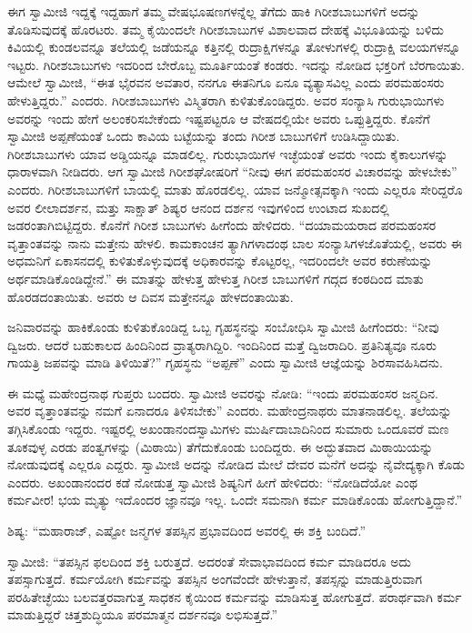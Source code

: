  ಈಗ ಸ್ವಾಮೀಜಿ ಇದ್ದಕ್ಕೆ ಇದ್ದಹಾಗೆ ತಮ್ಮ ವೇಷಭೂಷಣಗಳನ್ನೆಲ್ಲ ತೆಗೆದು ಹಾಕಿ ಗಿರೀಶಬಾಬುಗಳಿಗೆ ಅದನ್ನು ತೊಡಿಸುವುದಕ್ಕೆ ಹೊರಟರು. ತಮ್ಮ ಕೈಯಿಂದಲೇ ಗಿರೀಶಬಾಬುಗಳ ವಿಶಾಲವಾದ ದೇಹಕ್ಕೆ ವಿಭೂತಿಯನ್ನು ಬಳಿದು ಕಿವಿಯಲ್ಲಿ ಕುಂಡಲವನ್ನೂ ತಲೆಯಲ್ಲಿ ಜಡೆಯನ್ನೂ ಕತ್ತಿನಲ್ಲಿ ರುದ್ರಾಕ್ಷಿಗಳನ್ನೂ ತೋಳುಗಳಲ್ಲಿ ರುದ್ರಾಕ್ಷಿ ವಲಯಗಳನ್ನೂ ಇಟ್ಟರು. ಗಿರೀಶಬಾಬುಗಳು ಇದರಿಂದ ಬೇರೊಬ್ಬ ಮೂರ್ತಿಯಂತೆ ಕಂಡರು. ಇದನ್ನು ನೋಡಿದ ಭಕ್ತರಿಗೆ ಬೆರಗಾಯಿತು. ಆಮೇಲೆ ಸ್ವಾಮೀಜಿ, “ಈತ ಭೈರವನ ಅವತಾರ, ನನಗೂ ಈತನಿಗೂ ಏನೂ ವ್ಯತ್ಯಾಸವಿಲ್ಲ ಎಂದು ಪರಮಹಂಸರು ಹೇಳುತ್ತಿದ್ದರು.” ಎಂದರು. ಗಿರೀಶಬಾಬುಗಳು ವಿಸ್ಮಿತರಾಗಿ ಕುಳಿತುಕೊಂಡಿದ್ದರು. ಅವರ ಸಂನ್ಯಾಸಿ ಗುರುಭಾಯಿಗಳು ಅವರನ್ನು ಇಂದು ಹೇಗೆ ಅಲಂಕರಿಸಬೇಕೆಂದು ಇಷ್ಟಪಟ್ಟರೂ ಆ ವೇಷದಲ್ಲಿಯೇ ಅವರು ಒಪ್ಪುತ್ತಿದ್ದರು. ಕೊನೆಗೆ ಸ್ವಾಮೀಜಿ ಅಪ್ಪಣೆಯಂತೆ ಒಂದು ಕಾವಿಯ ಬಟ್ಟೆಯನ್ನು ತಂದು ಗಿರೀಶ ಬಾಬುಗಳಿಗೆ ಉಡಿಸಿದ್ದಾಯಿತು. ಗಿರೀಶಬಾಬುಗಳು ಯಾವ ಅಡ್ಡಿಯನ್ನೂ ಮಾಡಲಿಲ್ಲ. ಗುರುಭಾಯಿಗಳ ಇಚ್ಛೆಯಂತೆ ಅವರು ಇಂದು ಕೈಕಾಲುಗಳನ್ನು ಧಾರಾಳವಾಗಿ ನೀಡಿದರು. ಆಗ ಸ್ವಾಮೀಜಿ ಗಿರೀಶಘೋಷರಿಗೆ “ನೀವು ಈಗ ಪರಮಹಂಸರ ವಿಚಾರವನ್ನು ಹೇಳಬೇಕು” ಎಂದರು. ಗಿರೀಶಬಾಬುಗಳಿಗೆ ಬಾಯಲ್ಲಿ ಮಾತು ಹೊರಡಲಿಲ್ಲ. ಯಾವ ಜನ್ಮೋತ್ಸವಕ್ಕಾಗಿ ಇಂದು ಎಲ್ಲರೂ ಸೇರಿದ್ದರೊ ಅವರ ಲೀಲಾದರ್ಶನ, ಮತ್ತು ಸಾಕ್ಷಾತ್ ಶಿಷ್ಯರ ಆನಂದ ದರ್ಶನ ಇವುಗಳಿಂದ ಉಂಟಾದ ಸುಖದಲ್ಲಿ ಜಡರಂತಾಗಿಬಿಟ್ಟಿದ್ದರು. ಕೊನೆಗೆ ಗಿರೀಶ ಬಾಬುಗಳು ಹೀಗೆಂದು ಹೇಳಿದರು. “ದಯಾಮಯರಾದ ಪರಮಹಂಸರ ವೃತ್ತಾಂತವನ್ನು ನಾನು ಮತ್ತೇನು ಹೇಳಲಿ. ಕಾಮಕಾಂಚನ ತ್ಯಾಗಿಗಳಾದಂಥ ಬಾಲ ಸಂನ್ಯಾಸಿಗಳ\break ಜೊತೆಯಲ್ಲಿ, ಅವರು ಈ ಅಧಮನಿಗೆ ಏಕಾಸನದಲ್ಲಿ ಕುಳಿತುಕೊಳ್ಳುವುದಕ್ಕೆ ಅಧಿಕಾರವನ್ನು ಕೊಟ್ಟರಲ್ಲ, ಇದರಿಂದಲೇ ಅವರ ಕರುಣೆಯನ್ನು ಅರ್ಥಮಾಡಿಕೊಂಡಿದ್ದೇನೆ.” ಈ ಮಾತನ್ನು ಹೇಳುತ್ತ ಹೇಳುತ್ತ ಗಿರೀಶ ಬಾಬುಗಳಿಗೆ ಗದ್ಗದ ಕಂಠದಿಂದ ಮಾತು ಹೊರಡದಂತಾಯಿತು. ಅವರು ಆ ದಿವಸ ಮತ್ತೇನನ್ನೂ ಹೇಳದಂತಾಯಿತು. 

 ಜನಿವಾರವನ್ನು ಹಾಕಿಕೊಂಡು ಕುಳಿತುಕೊಂಡಿದ್ದ ಒಬ್ಬ ಗೃಹಸ್ಥನನ್ನು ಸಂಬೋಧಿಸಿ ಸ್ವಾಮೀಜಿ ಹೀಗೆಂದರು: “ನೀವು ದ್ವಿಜರು. ಆದರೆ ಬಹುಕಾಲದ ಹಿಂದಿನಿಂದ ವ್ರಾತ್ಯರಾಗಿದ್ದಿರಿ. ಇಂದಿನಿಂದ ಮತ್ತೆ ದ್ವಿಜರಾದಿರಿ. ಪ್ರತಿನಿತ್ಯವೂ ನೂರು ಗಾಯತ್ರಿ ಜಪವನ್ನು ಮಾಡಿ ತಿಳಿಯಿತೆ?” ಗೃಹಸ್ಥನು “ಅಪ್ಪಣೆ” ಎಂದು ಸ್ವಾಮೀಜಿ ಆಜ್ಞೆಯನ್ನು ಶಿರಸಾವಹಿಸಿದನು. 

 ಈ ಮಧ್ಯೆ ಮಹೇಂದ್ರನಾಥ ಗುಪ್ತರು ಬಂದರು. ಸ್ವಾಮೀಜಿ ಅವರನ್ನು ನೋಡಿ: “ಇಂದು ಪರಮಹಂಸರ ಜನ್ಮದಿನ. ಅವರ ವೃತ್ತಾಂತವನ್ನು ನಮಗೆ ಏನಾದರೂ ತಿಳಿಸಬೇಕು” ಎಂದರು. ಮಹೇಂದ್ರನಾಥರು ಮಾತನಾಡಲಿಲ್ಲ. ತಲೆಯನ್ನು ತಗ್ಗಿಸಿಕೊಂಡು ಇದ್ದರು. ಇಷ್ಟರಲ್ಲಿ ಅಖಂಡಾನಂದಸ್ವಾಮಿಗಳು ಮುರ್ಷಿದಾಬಾದಿನಿಂದ ಸುಮಾರು ಒಂದೂವರೆ ಮಣ ತೂಕವುಳ್ಳ ಎರಡು ಪಂತ್ವಗಳನ್ನು (ಮಿಠಾಯಿ) ತೆಗೆದುಕೊಂಡು ಬಂದಿದ್ದರು. ಈ ಅದ್ಭುತವಾದ ಮಿಠಾಯಿಯನ್ನು ನೋಡುವುದಕ್ಕೆ ಎಲ್ಲರೂ ಎದ್ದರು. ಸ್ವಾಮೀಜಿ ಅದನ್ನು ನೋಡಿದ ಮೇಲೆ ದೇವರ ಮನೆಗೆ ಅದನ್ನು ನೈವೇದ್ಯಕ್ಕಾಗಿ ಕೊಡು ಎಂದರು. ಅಖಂಡಾನಂದರ ಕಡೆ ನೋಡುತ್ತ ಸ್ವಾಮೀಜಿ ಶಿಷ್ಯನಿಗೆ ಹೀಗೆ ಹೇಳಿದರು: “ನೋಡಿದೆಯೋ ಎಂಥ ಕರ್ಮವೀರ! ಭಯ ಮೃತ್ಯು ಇದೊಂದರ ಜ್ಞಾನವೂ ಇಲ್ಲ. ಒಂದೇ ಸಮನಾಗಿ ಕರ್ಮ ಮಾಡಿಕೊಂಡು ಹೋಗುತ್ತಿದ್ದಾನೆ.” 

 ಶಿಷ್ಯ: “ಮಹಾರಾಜ್, ಎಷ್ಟೋ ಜನ್ಮಗಳ ತಪಸ್ಸಿನ ಪ್ರಭಾವದಿಂದ ಅವರಲ್ಲಿ ಈ ಶಕ್ತಿ ಬಂದಿದೆ.” 

 ಸ್ವಾಮೀಜಿ: “ತಪಸ್ಸಿನ ಫಲದಿಂದ ಶಕ್ತಿ ಬರುತ್ತದೆ. ಅದರಂತೆ ಸೇವಾಭಾವದಿಂದ ಕರ್ಮ ಮಾಡಿದರೂ ಅದು ತಪಸ್ಸಾಗುತ್ತದೆ. ಕರ್ಮಯೋಗಿ ಕರ್ಮವನ್ನು ತಪಸ್ಸಿನ ಅಂಗವೆಂದೇ ಹೇಳುತ್ತಾನೆ, ತಪಸ್ಸನ್ನು ಮಾಡುತ್ತಿರುವಾಗ ಪರಹಿತೇಚ್ಛೆಯು ಬಲವತ್ತರವಾಗುತ್ತ ಸಾಧಕನ ಕೈಯಿಂದ ಕರ್ಮವನ್ನು ಮಾಡಿಸುತ್ತ ಹೋಗುತ್ತದೆ. ಪರಾರ್ಥವಾಗಿ ಕರ್ಮ ಮಾಡುತ್ತಿದ್ದರೆ ಚಿತ್ತಶುದ್ಧಿಯೂ ಪರಮಾತ್ಮನ ದರ್ಶನವೂ ಲಭಿಸುತ್ತದೆ.” 

